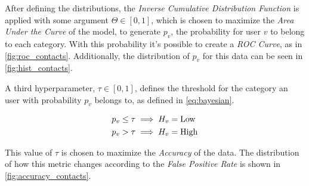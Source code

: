 After defining the distributions, the \emph{Inverse Cumulative Distribution Function} is applied with some argument $\Theta \in \left[ 0, 1 \right]$, which is chosen to maximize the \emph{Area Under the Curve} of the model, to generate $p_v$, the probability for user $v$ to belong to each category. With this probability it's possible to create a \emph{ROC Curve}, as in \cref{fig:roc_contacts}. Additionally, the distribution of $p_v$ for this data can be seen in \cref{fig:hist_contacts}.

A third hyperparameter, $\tau \in \left[ 0, 1 \right]$, defines the threshold for the category an user with probability $p_v$ belongs to, as defined in \cref{eq:bayesian}.

\begin{equation}
\label{eq:bayesian}
\begin{aligned}
	p_v \leq \tau &\implies H_v = \operatorname{Low} \\
	p_v > \tau &\implies H_v = \operatorname{High}
\end{aligned}
\end{equation}

This value of $\tau$ is chosen to maximize the \emph{Accuracy} of the data. The distribution of how this metric changes according to the \emph{False Positive Rate} is shown in \cref{fig:accuracy_contacts}.

